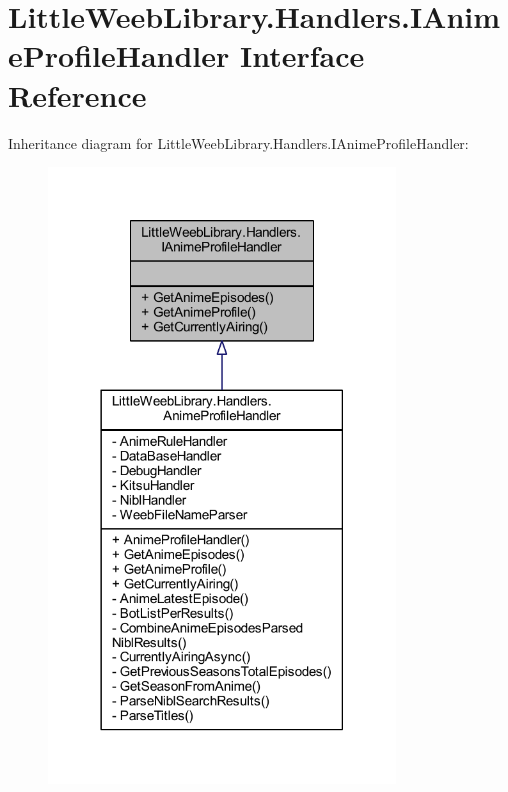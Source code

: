 \hypertarget{interface_little_weeb_library_1_1_handlers_1_1_i_anime_profile_handler}{}\section{Little\+Weeb\+Library.\+Handlers.\+I\+Anime\+Profile\+Handler Interface Reference}
\label{interface_little_weeb_library_1_1_handlers_1_1_i_anime_profile_handler}


Inheritance diagram for Little\+Weeb\+Library.\+Handlers.\+I\+Anime\+Profile\+Handler\+:\nopagebreak
\begin{figure}[H]
\begin{center}
\leavevmode
\includegraphics[width=261pt]{interface_little_weeb_library_1_1_handlers_1_1_i_anime_profile_handler__inherit__graph}
\end{center}
\end{figure}


